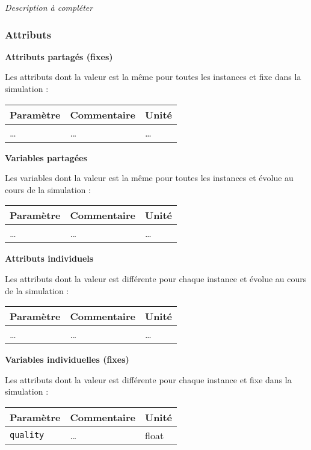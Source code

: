 \documentclass[
]{article}
\begin{document}
\emph{Description à compléter}

\subsubsection{Attributs}\label{attributs-10}

\textbf{Attributs partagés (fixes)}

Les attributs dont la valeur est la même pour toutes les instances et
fixe dans la simulation :

\begin{longtable}[]{@{}lll@{}}
\toprule\noalign{}
\textbf{Paramètre} & \textbf{Commentaire} & \textbf{Unité} \\
\midrule\noalign{}
\endhead
\bottomrule\noalign{}
\endlastfoot
\ldots{} & \ldots{} & \ldots{} \\
\end{longtable}

\textbf{Variables partagées}

Les variables dont la valeur est la même pour toutes les instances et
évolue au cours de la simulation :

\begin{longtable}[]{@{}lll@{}}
\toprule\noalign{}
\textbf{Paramètre} & \textbf{Commentaire} & \textbf{Unité} \\
\midrule\noalign{}
\endhead
\bottomrule\noalign{}
\endlastfoot
\ldots{} & \ldots{} & \ldots{} \\
\end{longtable}

\textbf{Attributs individuels}

Les attributs dont la valeur est différente pour chaque instance et
évolue au cours de la simulation :

\begin{longtable}[]{@{}lll@{}}
\toprule\noalign{}
\textbf{Paramètre} & \textbf{Commentaire} & \textbf{Unité} \\
\midrule\noalign{}
\endhead
\bottomrule\noalign{}
\endlastfoot
\ldots{} & \ldots{} & \ldots{} \\
\end{longtable}

\textbf{Variables individuelles (fixes)}

Les attributs dont la valeur est différente pour chaque instance et fixe
dans la simulation :

\begin{longtable}[]{@{}lll@{}}
\toprule\noalign{}
\textbf{Paramètre} & \textbf{Commentaire} & \textbf{Unité} \\
\midrule\noalign{}
\endhead
\bottomrule\noalign{}
\endlastfoot
\texttt{quality} & \ldots{} & float \\
\end{longtable}
\end{document}
